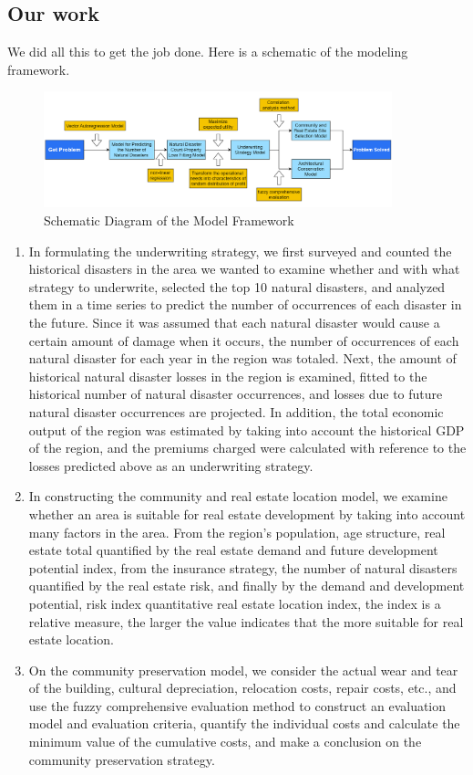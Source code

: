 \documentclass[12pt]{article}  %
\begin{document}
\subsection{Our work}
We did all this to get the job done. Here is a schematic of the modeling framework.

\begin{figure}[htbp]
\centering
\includegraphics[width=0.9\textwidth]{img/img08.png}
\caption{Schematic Diagram of the Model Framework}
\end{figure}

\clearpage

\begin{enumerate}[\bfseries 1.]
    \item In formulating the underwriting strategy, we first surveyed and counted the historical disasters in the area we wanted to examine whether and with what strategy to underwrite, selected the top 10 natural disasters, and analyzed them in a time series to predict the number of occurrences of each disaster in the future. Since it was assumed that each natural disaster would cause a certain amount of damage when it occurs, the number of occurrences of each natural disaster for each year in the region was totaled. Next, the amount of historical natural disaster losses in the region is examined, fitted to the historical number of natural disaster occurrences, and losses due to future natural disaster occurrences are projected. In addition, the total economic output of the region was estimated by taking into account the historical GDP of the region, and the premiums charged were calculated with reference to the losses predicted above as an underwriting strategy.
    \item In constructing the community and real estate location model, we examine whether an area is suitable for real estate development by taking into account many factors in the area. From the region's population, age structure, real estate total quantified by the real estate demand and future development potential index, from the insurance strategy, the number of natural disasters quantified by the real estate risk, and finally by the demand and development potential, risk index quantitative real estate location index, the index is a relative measure, the larger the value indicates that the more suitable for real estate location.
    \item On the community preservation model, we consider the actual wear and tear of the building, cultural depreciation, relocation costs, repair costs, etc., and use the fuzzy comprehensive evaluation method to construct an evaluation model and evaluation criteria, quantify the individual costs and calculate the minimum value of the cumulative costs, and make a conclusion on the community preservation strategy.
\end{enumerate}
\end{document}
